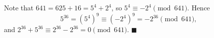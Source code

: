 Note that $641=625+16=5^4+2^4$, so $5^4\equiv-2^4\pmod{641}$. Hence
\[5^{36}=\left(5^4\right)^9\equiv\left(-2^4\right)^9=-2^{36}\pmod{641},\]
and $2^{36}+5^{36}\equiv2^{36}-2^{36}=0\pmod{641}$. $\blacksquare$
